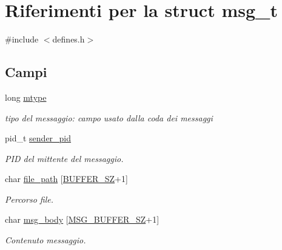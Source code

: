 \hypertarget{structmsg__t}{}\section{Riferimenti per la struct msg\+\_\+t}
\label{structmsg__t}


{\ttfamily \#include $<$defines.\+h$>$}

\subsection*{Campi}
\begin{DoxyCompactItemize}
\item 
\mbox{\label{structmsg__t_ad68bba21a7563b7da0f83beee6d822ec}} 
long \hyperlink{structmsg__t_ad68bba21a7563b7da0f83beee6d822ec}{mtype}
\begin{DoxyCompactList}\small\item\em tipo del messaggio\+: campo usato dalla coda dei messaggi \end{DoxyCompactList}\item 
\mbox{\label{structmsg__t_ae79f37d3dc8230fd465f68f694bbc059}} 
pid\+\_\+t \hyperlink{structmsg__t_ae79f37d3dc8230fd465f68f694bbc059}{sender\+\_\+pid}
\begin{DoxyCompactList}\small\item\em P\+ID del mittente del messaggio. \end{DoxyCompactList}\item 
\mbox{\label{structmsg__t_a217b6c7575ef559187625792d56be1cc}} 
char \hyperlink{structmsg__t_a217b6c7575ef559187625792d56be1cc}{file\+\_\+path} \mbox{[}\hyperlink{defines_8h_a22ad48d95fdd6689ea92e17ca5bbfccb}{B\+U\+F\+F\+E\+R\+\_\+\+SZ}+1\mbox{]}
\begin{DoxyCompactList}\small\item\em Percorso file. \end{DoxyCompactList}\item 
\mbox{\label{structmsg__t_afaa0628efb524911b1e6c433bb31ebf2}} 
char \hyperlink{structmsg__t_afaa0628efb524911b1e6c433bb31ebf2}{msg\+\_\+body} \mbox{[}\hyperlink{defines_8h_a46b84a677ff2bcf693b89247e39d75f7}{M\+S\+G\+\_\+\+B\+U\+F\+F\+E\+R\+\_\+\+SZ}+1\mbox{]}
\begin{DoxyCompactList}\small\item\em Contenuto messaggio. \end{DoxyCompactList}\end{DoxyCompactItemize}


